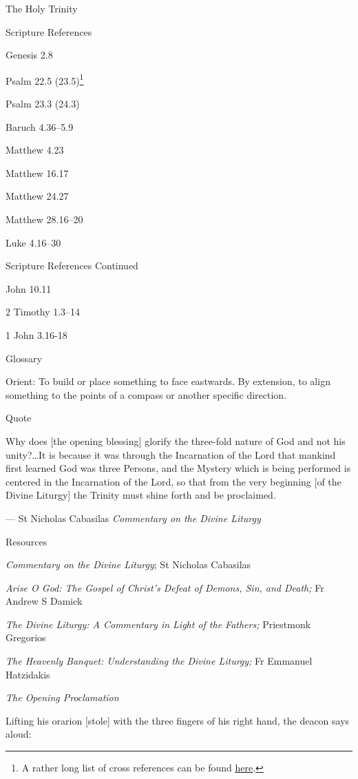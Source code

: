 \documentclass[
]{article}
\begin{document}
The Holy Trinity

Scripture References

Genesis 2.8

Psalm 22.5 (23.5)\footnote{A rather long list of cross references can be
  found
  \href{http://jimmyakin.com/deuterocanonical-references-in-the-new-testament}{\ul{here}}.}

Psalm 23.3 (24.3)

Baruch 4.36--5.9

Matthew 4.23

Matthew 16.17

Matthew 24.27

Matthew 28.16--20

Luke 4.16--30

Scripture References Continued

John 10.11

2 Timothy 1.3--14

1 John 3.16-18

Glossary

Orient: To build or place something to face eastwards. By extension, to
align something to the points of a compass or another specific
direction.

Quote

Why does {[}the opening blessing{]} glorify the three-fold nature of God
and not his unity?\ldots It is because it was through the Incarnation of
the Lord that mankind first learned God was three Persons, and the
Mystery which is being performed is centered in the Incarnation of the
Lord, so that from the very beginning {[}of the Divine Liturgy{]} the
Trinity must shine forth and be proclaimed.

--- St Nicholas Cabasilas \emph{Commentary on the Divine Liturgy}

Resources

\emph{Commentary on the Divine Liturgy}; St Nicholas Cabasilas

\emph{Arise O God: The Gospel of Christ's Defeat of Demons, Sin, and
Death;} Fr Andrew S Damick

\emph{The Divine Liturgy: A Commentary in Light of the Fathers;}
Priestmonk Gregorios

\emph{The Heavenly Banquet: Understanding the Divine Liturgy;} Fr
Emmanuel Hatzidakis

\emph{The Opening Proclamation}

Lifting his orarion {[}stole{]} with the three fingers of his right
hand, the deacon says aloud:
\end{document}
